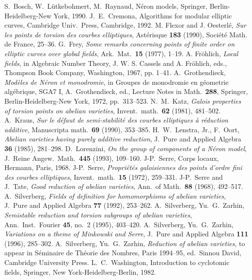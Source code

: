 \documentclass{amsart}
\theoremstyle{definition}
\begin{document}
\begin{thebibliography}{99}

 S.\ Bosch, W.\ L\"utkebohmert, M.\ Raynaud, N\'eron models,
Springer, Berlin-Heidelberg-New York, 1990.
 J.\ E.\ Cremona, Algorithms for modular
elliptic curves, Cambridge Univ.\ Press, Cambridge, 1992.
 M. Flexor and J. Oesterl\'e, {\em Sur les
points de torsion des courbes elliptiques}, Ast\'erisque {\bf 183} (1990),
Soci\'et\'e Math. de France, 25--36.
 G.\ Frey, {\em Some remarks concerning points of finite
order on elliptic curves over global fields}, Ark.\ Mat.\ {\bf 15} (1977),
1--19.
 A. Fr\"ohlich, {\em Local fields}, in Algebraic
Number Theory, J. W. S. Cassels and A. Fr\"ohlich, eds., Thompson
Book Company, Washington, 1967, pp. 1--41.
 A.\ Grothendieck, {\em Mod\`eles de N\'eron et monodromie},
in Groupes de monodromie en g\'eometrie alg\'ebrique, SGA7 I,
A.\ Gro\-then\-dieck, ed., Lecture Notes in Math.\ {\bf 288}, Springer,
Berlin-Heidelberg-New York, 1972, pp.\ 313--523.
 N.\ M.\ Katz, {\em Galois properties of torsion
points on abelian varieties}, Invent.\ math.\ {\bf 62} (1981), 481--502.
 A.\ Kraus, {\em Sur le d\'efaut de semi-stabilit\'e
des courbes elliptiques \`a r\'eduction additive},
Manuscripta math.\ {\bf 69} (1990), 353--385.
 H.\ W.\  Lenstra, Jr., F.\ Oort, {\em Abelian varieties
having purely additive reduction}, J.\ Pure and Applied Algebra {\bf 36}
(1985), 281--298.
 D.\ Lorenzini, {\em On the group of components of a
N\'eron model}, J.\ Reine Angew.\ Math.\ {\bf 445} (1993), 109--160.
 J-P.\ Serre, Corps locaux, Hermann, Paris, 1968.
 J-P.\ Serre, {\em Propri\'et\'es galoisiennes des
points d'ordre fini des courbes elliptiques}, Invent.\ math.\ {\bf 15}
(1972), 259--331.
 J-P.\ Serre and J.\ Tate, {\em Good reduction of abelian 
varieties}, Ann.\ of Math.\ {\bf 88} (1968), 492--517. 
 A.\ Silverberg,  {\em Fields of definition for homomorphisms 
of abelian varieties}, J.\ Pure and Applied Algebra {\bf 77} (1992), 
253--262.
 A.\ Silverberg, Yu.\ G.\ Zarhin, {\em Semistable reduction 
and torsion subgroups of abelian varieties}, 
Ann.\ Inst.\ Fourier {\bf 45}, no.~2 (1995), 403--420.
 A.\ Silverberg, Yu.\ G.\ Zarhin, {\em Variations on a 
theme of Minkowski and Serre}, 
J.\ Pure and Applied Algebra {\bf 111} (1996), 285--302.
 A.\ Silverberg, Yu.\ G.\ Zarhin, {\em Reduction of abelian
varieties}, to appear in S\'eminaire de Th\'e\-o\-rie des Nombres, 
Paris 1994--95, ed.\ Sinnou David, Cambridge University Press.
 L.\ C.\ Washington, Introduction to cyclotomic fields,
Springer, New York-Heidelberg-Berlin, 1982.

\end{thebibliography}
\end{document}
